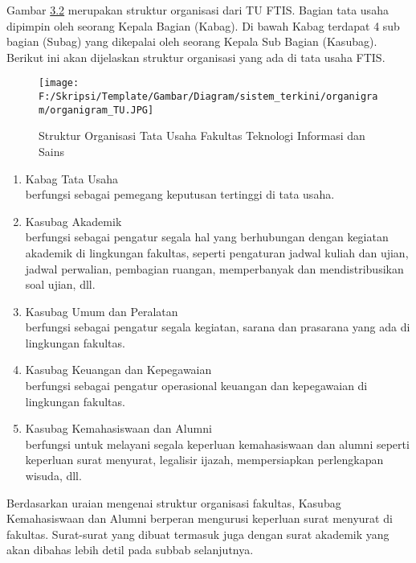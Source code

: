 Gambar \hyperlink{organigram_TU}{3.2} merupakan struktur organisasi dari TU FTIS. Bagian tata usaha dipimpin oleh seorang Kepala Bagian (Kabag). Di bawah Kabag terdapat 4 sub bagian (Subag) yang dikepalai oleh seorang Kepala Sub Bagian (Kasubag). Berikut ini akan dijelaskan struktur organisasi yang ada di tata usaha FTIS.
\begin{figure}[H]
	\centering
		\texttt{[image: F:/Skripsi/Template/Gambar/Diagram/sistem\_terkini/organigram/organigram\_TU.JPG]}
	\caption{Struktur Organisasi Tata Usaha Fakultas Teknologi Informasi dan Sains}
	\label{fig:organigram_TU}
\end{figure}
\begin{enumerate}
	\item Kabag Tata Usaha \\
	berfungsi sebagai pemegang keputusan tertinggi di tata usaha.
	\item Kasubag Akademik \\
	berfungsi sebagai pengatur segala hal yang berhubungan dengan kegiatan akademik di lingkungan fakultas, seperti pengaturan jadwal kuliah dan ujian, jadwal perwalian, pembagian ruangan, memperbanyak dan mendistribusikan soal ujian, dll.
	\item Kasubag Umum dan Peralatan \\
	berfungsi sebagai pengatur segala kegiatan, sarana dan prasarana yang ada di lingkungan fakultas. 
	\item Kasubag Keuangan dan Kepegawaian \\
	berfungsi sebagai pengatur operasional keuangan dan kepegawaian di lingkungan fakultas.
	\item Kasubag Kemahasiswaan dan Alumni \\
	berfungsi untuk melayani segala keperluan kemahasiswaan dan alumni seperti keperluan surat menyurat, legalisir ijazah, mempersiapkan perlengkapan wisuda, dll.
\end{enumerate}
Berdasarkan uraian mengenai struktur organisasi fakultas, Kasubag Kemahasiswaan dan Alumni berperan mengurusi keperluan surat menyurat di fakultas. Surat-surat yang dibuat termasuk juga dengan surat akademik yang akan dibahas lebih detil pada subbab selanjutnya.

